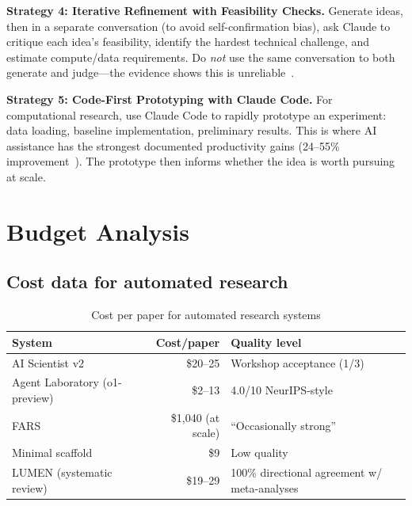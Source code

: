 \documentclass[11pt,a4paper]{article}
\begin{document}
\textbf{Strategy 4: Iterative Refinement with Feasibility Checks.} Generate ideas, then in a separate conversation (to avoid self-confirmation bias), ask Claude to critique each idea's feasibility, identify the hardest technical challenge, and estimate compute/data requirements. Do \emph{not} use the same conversation to both generate and judge---the evidence shows this is unreliable~\cite{ideationarena2026}.

\textbf{Strategy 5: Code-First Prototyping with Claude Code.} For computational research, use Claude Code to rapidly prototype an experiment: data loading, baseline implementation, preliminary results. This is where AI assistance has the strongest documented productivity gains (24--55\% improvement~\cite{murphyhill2026,bis2025}). The prototype then informs whether the idea is worth pursuing at scale.


\section{Budget Analysis}
\label{sec:budget}

\subsection{Cost data for automated research}

\begin{table}[h]
\centering
\caption{Cost per paper for automated research systems}
\label{tab:costs}
\begin{tabular}{lrl}
\toprule
\textbf{System} & \textbf{Cost/paper} & \textbf{Quality level} \\
\midrule
AI Scientist v2~\cite{sakana2025v2} & \$20--25 & Workshop acceptance (1/3) \\
Agent Laboratory (o1-preview)~\cite{agentlab2025} & \$2--13 & 4.0/10 NeurIPS-style \\
FARS~\cite{fars2026} & \$1,040 (at scale) & ``Occasionally strong'' \\
Minimal scaffold~\cite{fars2026} & \$9 & Low quality \\
LUMEN (systematic review)~\cite{lumen2026} & \$19--29 & 100\% directional agreement w/ meta-analyses \\
\bottomrule
\end{tabular}
\end{table}
\end{document}
